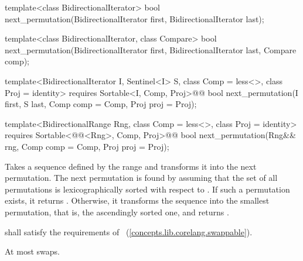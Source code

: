 %
\begin{removedblock}
\begin{itemdecl}
template<class BidirectionalIterator>
  bool next_permutation(BidirectionalIterator first,
                        BidirectionalIterator last);

template<class BidirectionalIterator, class Compare>
  bool next_permutation(BidirectionalIterator first,
                        BidirectionalIterator last, Compare comp);
\end{itemdecl}
\end{removedblock}
\begin{addedblock}
\begin{itemdecl}
template<BidirectionalIterator I, Sentinel<I> S, class Comp = less<>,
    class Proj = identity>
  requires Sortable<I, Comp, Proj>@\newtxt{()}@
  bool next_permutation(I first, S last, Comp comp = Comp{}, Proj proj = Proj{});

template<BidirectionalRange Rng, class Comp = less<>,
    class Proj = identity>
  requires Sortable<@@<Rng>, Comp, Proj>@\newtxt{()}@
  bool
    next_permutation(Rng&& rng, Comp comp = Comp{}, Proj proj = Proj{});
\end{itemdecl}
\end{addedblock}

\begin{itemdescr}
\pnum
\effects
Takes a sequence defined by the range
and transforms it into the next permutation.
The next permutation is found by assuming that the set of all permutations is
lexicographically sorted with respect to
 .
If such a permutation exists, it returns
.
Otherwise, it transforms the sequence into the smallest permutation,
that is, the ascendingly sorted one, and returns
.

\begin{removedblock}
\pnum
\requires
{} shall satisfy the requirements of
~(\ref{concepts.lib.corelang.swappable}).
\end{removedblock}

\pnum
\complexity
At most
swaps.
\end{itemdescr}

